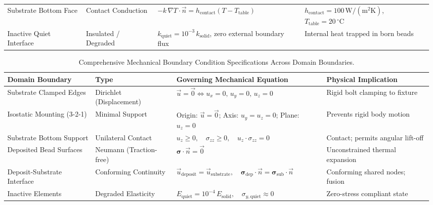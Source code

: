 \documentclass[10pt,a4paper]{article}
\begin{document}
\begin{table}[h!]
\begin{tabularx}{\textwidth}{p{3.2cm} p{2.4cm} X p{3.2cm}}
\addlinespace[0.3em]
Substrate Bottom Face & Contact Conduction & $-k\,\nabla T \cdot \vec{n} = h_{\mathrm{contact}}(T - T_{\mathrm{table}})$ & $h_{\mathrm{contact}} = 100\,\mathrm{W/(m^2K)}$, $T_{\mathrm{table}} = 20\,^\circ\mathrm{C}$ \\
\addlinespace[0.3em]
Inactive Quiet Interface & Insulated / Degraded & $k_{\mathrm{quiet}} = 10^{-3}\,k_{\mathrm{solid}}$, zero external boundary flux & Internal heat trapped in born beads \\
\bottomrule
\end{tabularx}
\end{table}

\begin{table}[h!]
\centering
\small
\caption{Comprehensive Mechanical Boundary Condition Specifications Across Domain Boundaries.}
\label{tab:mech_bc}
\vspace{0.4em}
\begin{tabularx}{\textwidth}{p{3.2cm} p{2.4cm} X p{3.2cm}}
\toprule
\textbf{Domain Boundary} & \textbf{Type} & \textbf{Governing Mechanical Equation} & \textbf{Physical Implication} \\
\midrule
Substrate Clamped Edges & Dirichlet (Displacement) & $\vec{u} = \vec{0} \iff u_x = 0,\,u_y = 0,\,u_z = 0$ & Rigid bolt clamping to fixture \\
\addlinespace[0.3em]
Isostatic Mounting (3-2-1) & Minimal Support & Origin: $\vec{u}=\vec{0}$; Axis: $u_y=u_z=0$; Plane: $u_z=0$ & Prevents rigid body motion \\
\addlinespace[0.3em]
Substrate Bottom Support & Unilateral Contact & $u_z \ge 0, \quad \sigma_{zz} \ge 0, \quad u_z \cdot \sigma_{zz} = 0$ & Contact; permits angular lift-off \\
\addlinespace[0.3em]
Deposited Bead Surfaces & Neumann (Traction-free) & $\boldsymbol{\sigma} \cdot \vec{n} = \vec{0}$ & Unconstrained thermal expansion \\
\addlinespace[0.3em]
Deposit-Substrate Interface & Conforming Continuity & $\vec{u}_{\mathrm{deposit}} = \vec{u}_{\mathrm{substrate}}, \quad \boldsymbol{\sigma}_{\mathrm{dep}}\cdot\vec{n} = \boldsymbol{\sigma}_{\mathrm{sub}}\cdot\vec{n}$ & Conforming shared nodes; fusion \\
\addlinespace[0.3em]
Inactive Elements & Degraded Elasticity & $E_{\mathrm{quiet}} = 10^{-4}\,E_{\mathrm{solid}}, \quad \sigma_{y,\mathrm{quiet}} \approx 0$ & Zero-stress compliant state \\
\bottomrule
\end{tabularx}
\end{table}
\end{document}
